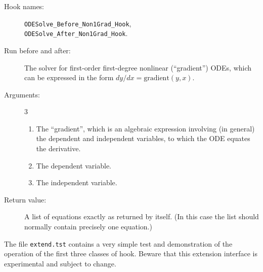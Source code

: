 \begin{description}
\item[Hook names:] \texttt{ODESolve\_Before\_Non1Grad\_Hook}, \\
\texttt{ODESolve\_After\_Non1Grad\_Hook}.
\item[Run before and after:] The solver for first-order first-degree
nonlinear (``gradient'') ODEs, which can be expressed in the form
$dy/dx = \mathrm{gradient}(y,x)$.
\item[Arguments:] 3
\begin{enumerate}
\item The ``gradient'', which is an algebraic expression involving (in
general) the dependent and independent variables, to which the ODE
equates the derivative.
\item The dependent variable.
\item The independent variable.
\end{enumerate}
\item[Return value:] A list of equations exactly as returned by
 itself.  (In this case the list should normally contain
precisely one equation.)
\end{description}

\noindent\hrulefill
\bigskip

The file \texttt{extend.tst} contains a very simple test and
demonstration of the operation of the first three classes of hook.
Beware that this extension interface is experimental and subject to
change.

